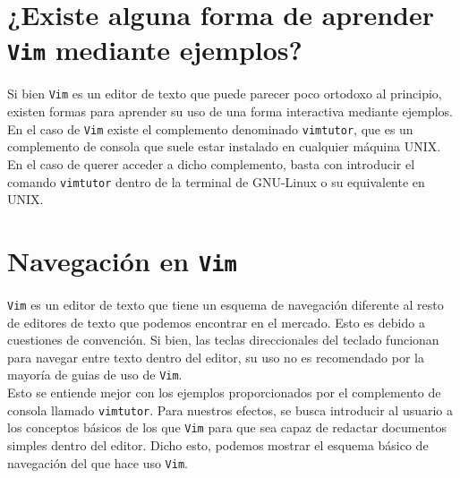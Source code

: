 \documentclass[10pt]{article}
\begin{document}
\section{¿Existe alguna forma de aprender \texttt{Vim} mediante ejemplos?}
Si bien \texttt{Vim} es un editor de texto que puede parecer poco ortodoxo al principio, existen formas para aprender su uso de una forma interactiva mediante ejemplos. En el caso de \texttt{Vim} existe el complemento denominado \texttt{vimtutor}, que es un complemento de consola que suele estar instalado en cualquier máquina UNIX. En el caso de querer acceder a dicho complemento, basta con introducir el comando \texttt{vimtutor} dentro de la terminal de GNU-Linux o su equivalente en UNIX. 
\section{Navegación en \texttt{Vim}}
\texttt{Vim} es un editor de texto que tiene un esquema de navegación diferente al resto de editores de texto que podemos encontrar en el mercado. Esto es debido a cuestiones de convención. 
Si bien, las teclas direccionales del teclado funcionan para navegar entre texto dentro del editor, su uso no es recomendado por la mayoría de guias de uso de \texttt{Vim}. \\
Esto se entiende mejor con los ejemplos proporcionados por el complemento de consola llamado \texttt{vimtutor}. Para nuestros efectos, se busca introducir al usuario a los conceptos básicos de los que \texttt{Vim} para que sea capaz de redactar documentos simples dentro del editor. Dicho esto, podemos mostrar el esquema básico de navegación del que hace uso \texttt{Vim}.
\end{document}
